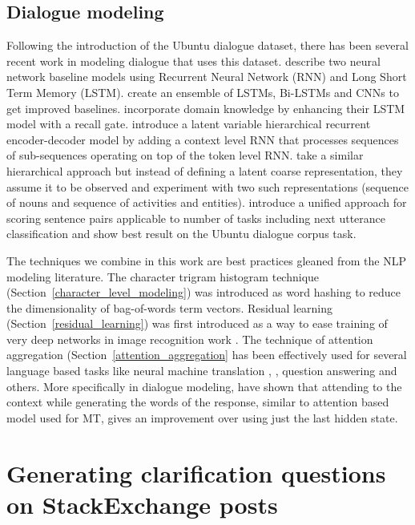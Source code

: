 \documentclass[11pt]{report}
\begin{document}
\section{Dialogue modeling}

Following the introduction of the Ubuntu dialogue dataset, there has been several recent work in modeling dialogue that uses this dataset. \cite{DBLP:conf/sigdial/LowePSP15} describe two neural network baseline models using Recurrent Neural Network (RNN) and Long Short Term Memory (LSTM). 
\cite{DBLP:journals/corr/KadlecSK15} create an ensemble of LSTMs, Bi-LSTMs and CNNs to get improved baselines. 
\cite{xu2016incorporating} incorporate domain knowledge by enhancing their LSTM model with a recall gate.
\cite{serban2016hierarchical} introduce a latent variable hierarchical recurrent encoder-decoder model by adding a context level RNN that processes sequences of sub-sequences operating on top of the token level RNN.
\cite{serban2016multiresolution} take a similar hierarchical approach but instead of defining a latent coarse representation, they assume it to be observed and experiment with two such representations (sequence of nouns and sequence of activities and entities).
\cite{baudivs2016sentence} introduce a unified approach for scoring sentence pairs applicable to number of tasks including next utterance classification and show best result on the Ubuntu dialogue corpus task. 

The techniques we combine in this work are best practices gleaned from the NLP modeling literature. 
The character trigram histogram technique (Section~\ref{character_level_modeling}) was introduced as word hashing \cite{DBLP:conf/cikm/HuangHGDAH13} to reduce the dimensionality of bag-of-words term vectors. Residual learning (Section~\ref{residual_learning}) was first introduced as a way to ease training of very deep networks in image recognition work \cite{he2015deep}. The technique of attention aggregation (Section~\ref{attention_aggregation} has been effectively used for several language based tasks like neural machine translation \cite{DBLP:journals/corr/BahdanauCB14}, \cite{DBLP:conf/emnlp/LuongPM15}, question answering \cite{} and others. More specifically in dialogue modeling, \cite{DBLP:journals/corr/YaoPZW16} have shown that attending to the context while generating the words of the response, similar to attention based model used for MT, gives an improvement over using just the last hidden state.


\newpage

\chapter{Generating clarification questions on StackExchange posts}
\end{document}
